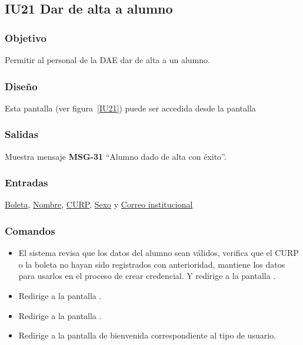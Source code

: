 
\subsection{IU21 Dar de alta a alumno}

\subsubsection{Objetivo}
	Permitir al personal de la DAE dar de alta a un alumno.
\subsubsection{Diseño}
    Esta pantalla  (ver figura~\ref{IU21}) puede ser accedida desde la pantalla 


\subsubsection{Salidas}
Muestra mensaje {\bf MSG-31} ``Alumno dado de alta con éxito''.
\subsubsection{Entradas}
    \hyperlink{Alumno.Boleta}{Boleta}, \hyperlink{Alumno.Nombre}{Nombre}, \hyperlink{Alumno.CURP}{CURP}, \hyperlink{Alumno.Sexo}{Sexo} y \hyperlink{Alumno.Correo institucional}{Correo institucional}
\subsubsection{Comandos}
\begin{itemize}
    \item {}  El sistema revisa que los datos del alumno sean válidos, verifica que el CURP o la boleta no hayan sido registrados con anterioridad, mantiene los datos para usarlos en el proceso de crear credencial. Y redirige a la pantalla .
    \item {} Redirige a la pantalla .
    \item {} Redirige a la pantalla .
    \item {} Redirige a la pantalla de bienvenida correspondiente al tipo de usuario.
    
\end{itemize}


